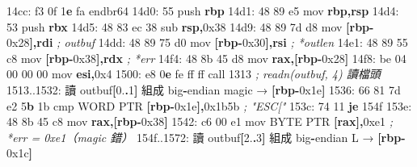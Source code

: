 \documentclass[10pt,a4paper]{article}
\newenvironment{Shaded}{\begin{snugshade}}{\end{snugshade}}
\newcommand{\BaseNTok}[1]{\textcolor[rgb]{0.00,0.00,0.81}{#1}}
\newcommand{\BuiltInTok}[1]{#1}
\newcommand{\CommentTok}[1]{\textcolor[rgb]{0.56,0.35,0.01}{\textit{#1}}}
\newcommand{\ControlFlowTok}[1]{\textcolor[rgb]{0.13,0.29,0.53}{\textbf{#1}}}
\newcommand{\DataTypeTok}[1]{\textcolor[rgb]{0.13,0.29,0.53}{#1}}
\newcommand{\DecValTok}[1]{\textcolor[rgb]{0.00,0.00,0.81}{#1}}
\newcommand{\ErrorTok}[1]{\textcolor[rgb]{0.64,0.00,0.00}{\textbf{#1}}}
\newcommand{\FloatTok}[1]{\textcolor[rgb]{0.00,0.00,0.81}{#1}}
\newcommand{\KeywordTok}[1]{\textcolor[rgb]{0.13,0.29,0.53}{\textbf{#1}}}
\newcommand{\NormalTok}[1]{#1}
\newcommand{\OperatorTok}[1]{\textcolor[rgb]{0.81,0.36,0.00}{\textbf{#1}}}
\renewenvironment{Shaded}{%
  \def\FrameCommand{\fboxsep=3.2pt\colorbox{shadecolor}}%
  \MakeFramed{\advance\hsize-\width\FrameRestore\small}%
}{%
  \endMakeFramed
}
\begin{document}
\begin{Shaded}
\begin{Highlighting}[]
\NormalTok{14cc: f3 }\FloatTok{0}\BaseNTok{f} \DecValTok{1}\ErrorTok{e}\NormalTok{ fa            endbr64}
\NormalTok{14d0: 55                     }\BuiltInTok{push}   \KeywordTok{rbp}
\NormalTok{14d1: 48 89 e5               mov    }\KeywordTok{rbp}\OperatorTok{,}\KeywordTok{rsp}
\NormalTok{14d4: 53                     }\BuiltInTok{push}   \KeywordTok{rbx}
\NormalTok{14d5: 48 83 ec }\DecValTok{38}\NormalTok{            sub    }\KeywordTok{rsp}\OperatorTok{,}\BaseNTok{0x38}
\NormalTok{14d9: 48 89 7d d8            mov    }\OperatorTok{[}\KeywordTok{rbp}\OperatorTok{{-}}\BaseNTok{0x28}\OperatorTok{],}\KeywordTok{rdi}        \CommentTok{; outbuf}
\NormalTok{14dd: 48 89 75 d0            mov    }\OperatorTok{[}\KeywordTok{rbp}\OperatorTok{{-}}\BaseNTok{0x30}\OperatorTok{],}\KeywordTok{rsi}        \CommentTok{; *outlen}
\NormalTok{14e1: 48 89 55 c8            mov    }\OperatorTok{[}\KeywordTok{rbp}\OperatorTok{{-}}\BaseNTok{0x38}\OperatorTok{],}\KeywordTok{rdx}        \CommentTok{; *err}
\NormalTok{14f4: 48 8b 45 d8            mov    }\KeywordTok{rax}\OperatorTok{,[}\KeywordTok{rbp}\OperatorTok{{-}}\BaseNTok{0x28}\OperatorTok{]}
\NormalTok{14f8: be }\DecValTok{04} \DecValTok{00} \DecValTok{00} \DecValTok{00}\NormalTok{         mov    }\KeywordTok{esi}\OperatorTok{,}\BaseNTok{0x4}
\NormalTok{1500: e8 }\DecValTok{0}\ErrorTok{e}\NormalTok{ fe ff ff         call   }\DecValTok{1313}                 \CommentTok{; readn(outbuf, 4) 讀檔頭}
\NormalTok{1513..1532: 讀 outbuf}\OperatorTok{[}\FloatTok{0.}\OperatorTok{.}\DecValTok{1}\OperatorTok{]}\NormalTok{ 組成 big}\OperatorTok{{-}}\NormalTok{endian magic → }\OperatorTok{[}\KeywordTok{rbp}\OperatorTok{{-}}\BaseNTok{0x1e}\OperatorTok{]}
\NormalTok{1536: 66 81 7d e2 }\DecValTok{5}\ErrorTok{b} \BaseNTok{1b}\NormalTok{      cmp    }\DataTypeTok{WORD} \DataTypeTok{PTR} \OperatorTok{[}\KeywordTok{rbp}\OperatorTok{{-}}\BaseNTok{0x1e}\OperatorTok{],}\BaseNTok{0x1b5b}    \CommentTok{; "ESC["}
\NormalTok{153c: 74 11                  }\ControlFlowTok{je}     \FloatTok{154}\BaseNTok{f}
\NormalTok{153e: 48 8b 45 c8            mov    }\KeywordTok{rax}\OperatorTok{,[}\KeywordTok{rbp}\OperatorTok{{-}}\BaseNTok{0x38}\OperatorTok{]}
\NormalTok{1542: c6 }\DecValTok{00}\NormalTok{ e1               mov    }\DataTypeTok{BYTE} \DataTypeTok{PTR} \OperatorTok{[}\KeywordTok{rax}\OperatorTok{],}\BaseNTok{0xe1}   \CommentTok{; *err = 0xe1（magic 錯）}
\NormalTok{154f..1572: 讀 outbuf}\OperatorTok{[}\FloatTok{2.}\OperatorTok{.}\DecValTok{3}\OperatorTok{]}\NormalTok{ 組成 big}\OperatorTok{{-}}\NormalTok{endian L → }\OperatorTok{[}\KeywordTok{rbp}\OperatorTok{{-}}\BaseNTok{0x1c}\OperatorTok{]}

\end{Highlighting}
\end{Shaded}
\end{document}

